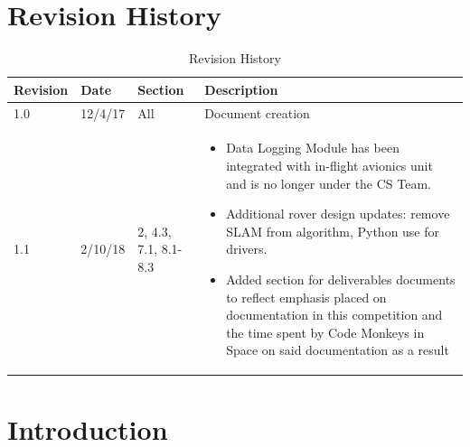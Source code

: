 \documentclass[onecolumn, draftclsnofoot,10pt, compsoc]{IEEEtran}
\begin{document}
\section{Revision History}
\begin{table}[h]
\centering
\caption{Revision History}
\label{my-label}
\begin{tabular}{@{}lllp{12cm}@{}}
\toprule
\textbf{Revision}    & \textbf{Date}            & \textbf{Section}  & \textbf{Description}                                                                                                                                             \\ \midrule
1.0                  & 12/4/17                  & All               & Document creation                                                                                                                                                \\ \midrule
1.1 & 2/10/18 & 2, 4.3, 7.1, 8.1-8.3 & \vspace{-15pt} \begin{itemize} \item Data Logging Module has been integrated with in-flight avionics unit and is no longer under the CS Team. \item Additional rover design updates: remove SLAM from algorithm, Python use for drivers. \item Added section for deliverables documents to reflect emphasis placed on documentation in this competition and the time spent by Code Monkeys in Space on said documentation as a result\end{itemize} \vspace{-15pt} \\ \bottomrule
\end{tabular}
\end{table}


\section{Introduction}
\end{document}

